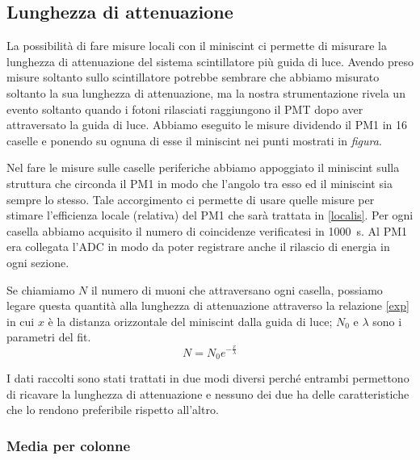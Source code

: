 \subsection{Lunghezza di attenuazione}
\label{attenu}

La possibilità di fare misure locali con il miniscint 
ci permette di misurare la lunghezza di attenuazione del sistema scintillatore più guida di luce. Avendo preso misure soltanto sullo scintillatore potrebbe sembrare che abbiamo misurato soltanto la sua lunghezza di attenuazione, ma la nostra strumentazione rivela un evento soltanto quando i fotoni rilasciati raggiungono il PMT dopo aver attraversato la guida di luce. 
Abbiamo eseguito le misure dividendo il PM1 in 16 caselle e ponendo su ognuna di esse il miniscint nei punti mostrati in \emph{figura}. 

Nel fare le misure sulle caselle periferiche abbiamo appoggiato il miniscint sulla struttura che circonda il PM1 in modo che l'angolo tra esso ed il miniscint sia sempre lo stesso. Tale accorgimento ci permette di usare quelle misure per stimare l'efficienza locale (relativa) del PM1 che sarà trattata in \autoref{localis}.                            
Per ogni casella abbiamo acquisito il numero di coincidenze verificatesi in \SI{1000}{s}. Al PM1 era collegata l'ADC in modo da poter registrare anche il rilascio di energia in ogni sezione.

Se chiamiamo $N$ il numero di muoni che attraversano ogni casella, possiamo legare questa quantità alla lunghezza di attenuazione attraverso la relazione \eqref{exp} in cui $x$ è la distanza orizzontale del miniscint dalla guida di luce; $N_0$ e $\lambda$ sono i parametri del fit. 
\begin{equation}
N=N_0 e^{-\frac{x}{\lambda}}  \label{exp}
\end{equation}

I dati raccolti sono stati trattati in due modi diversi perché entrambi permettono di ricavare la lunghezza di attenuazione e nessuno dei due ha delle caratteristiche che lo rendono preferibile rispetto all'altro.

\subsubsection{Media per colonne}

